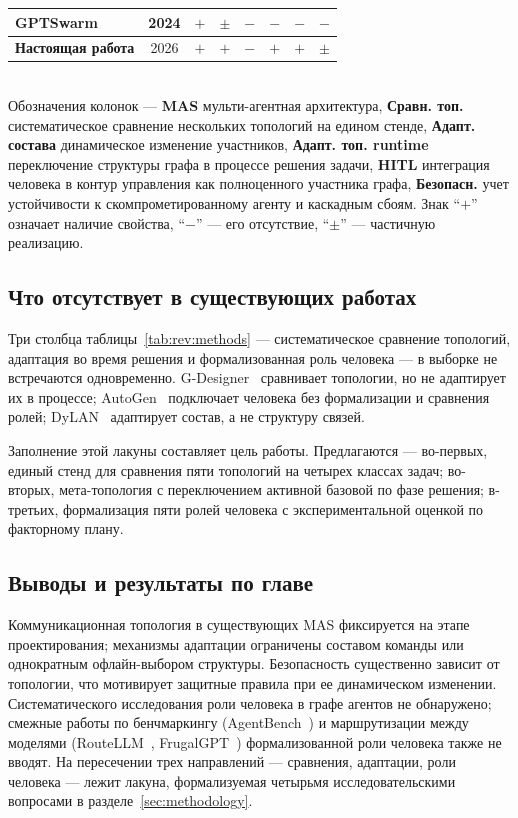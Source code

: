 \begin{table}[!htbp]
\begin{tabularx}{\textwidth}{l c c c c c c c}
GPTSwarm~\cite{zhuge2024}          & 2024 & $+$ & $\pm$ & $-$ & $-$ & $-$ & $-$ \\
\midrule
\textbf{Настоящая работа}          & 2026 & $+$ & $+$ & $-$ & $+$ & $+$ & $\pm$ \\
\bottomrule
\end{tabularx}
\\[0.3cm]
\footnotesize
Обозначения колонок ---
\textbf{MAS} мульти-агентная архитектура,
\textbf{Сравн. топ.} систематическое сравнение нескольких топологий
на едином стенде,
\textbf{Адапт. состава} динамическое изменение участников,
\textbf{Адапт. топ. runtime} переключение структуры графа в процессе
решения задачи,
\textbf{HITL} интеграция человека в контур управления как
полноценного участника графа,
\textbf{Безопасн.} учет устойчивости к скомпрометированному агенту
и каскадным сбоям. Знак \enquote{$+$} означает наличие свойства,
\enquote{$-$} --- его отсутствие, \enquote{$\pm$} --- частичную
реализацию.
\end{table}

\subsection{Что отсутствует в существующих работах}
\label{sec:rev:gap}

Три столбца таблицы~\ref{tab:rev:methods} --- систематическое
сравнение топологий, адаптация во время решения и формализованная
роль человека --- в выборке не встречаются одновременно.
G-Designer~\cite{zhang2024} сравнивает топологии, но не адаптирует
их в процессе; AutoGen~\cite{wu2023} подключает человека без
формализации и сравнения ролей; DyLAN~\cite{liu2023} адаптирует
состав, а не структуру связей.

Заполнение этой лакуны составляет цель работы. Предлагаются ---
во-первых, единый стенд для сравнения пяти топологий на четырех
классах задач; во-вторых, мета-топология с переключением активной
базовой по фазе решения; в-третьих, формализация пяти ролей
человека с экспериментальной оценкой по факторному плану.

\subsection{Выводы и результаты по главе}
\label{sec:rev:summary}

Коммуникационная топология в существующих MAS фиксируется на
этапе проектирования; механизмы адаптации ограничены составом
команды или однократным офлайн-выбором структуры. Безопасность
существенно зависит от топологии, что мотивирует защитные правила
при ее динамическом изменении. Систематического исследования роли
человека в графе агентов не обнаружено; смежные работы по
бенчмаркингу (AgentBench~\cite{agentbench2023}) и маршрутизации
между моделями (RouteLLM~\cite{routellm2024},
FrugalGPT~\cite{frugalgpt2023}) формализованной роли человека также
не вводят. На пересечении трех направлений --- сравнения,
адаптации, роли человека --- лежит лакуна, формализуемая четырьмя
исследовательскими вопросами в разделе~\ref{sec:methodology}.
